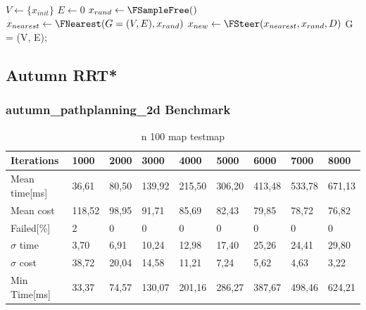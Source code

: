 \begin{algorithm}[H]
	\caption{RRT* 2011\footcite{Karaman2011}}
	$V \gets \{x_{init}\}$\;
	$E \gets 0$\;
	 {
		$x_{rand} \gets \FSampleFree()$\;
		$x_{nearest} \gets \FNearest(G = (V, E), x_{rand})$\;
		$x_{new} \gets \FSteer(x_{nearest}, x_{rand}, D)$\;
	}
	\Return G = (V, E);
\end{algorithm}

\subsection{Autumn RRT*}

\subsubsection{autumn\_pathplanning\_2d Benchmark}

\begin{table}[!ht]
	
	\centering
	\renewcommand{\arraystretch}{1.2}
	\begin{tabular}{|l||l|l|l|l|l|l|l|l|}
		\hline
		Iterations & 1000 & 2000 & 3000 & 4000 & 5000 & 6000 & 7000 & 8000 \\ \hline\hline
		Mean time[ms] & 36,61 & 80,50 & 139,92 & 215,50 & 306,20 & 413,48 & 533,78 & 671,13 \\ \hline
		Mean cost & 118,52 & 98,95 & 91,71 & 85,69 & 82,43 & 79,85 & 78,72 & 76,82 \\ \hline
		Failed[\%] & 2 & 0 & 0 & 0 & 0 & 0 & 0 & 0 \\ \hline
		$\sigma$ time & 3,70 & 6,91 & 10,24 & 12,98 & 17,40 & 25,26 & 24,41 & 29,80 \\ \hline
		$\sigma$ cost & 38,72 & 20,04 & 14,58 & 11,21 & 7,24 & 5,62 & 4,63 & 3,22 \\ \hline
		Min Time[ms] & 33,37 & 74,57 & 130,07 & 201,16 & 286,27 & 387,67 & 498,46 & 624,21 \\ \hline
	\end{tabular}
	\label{tab:pp_precision1}
	\caption{n 100 map testmap}
\end{table}

